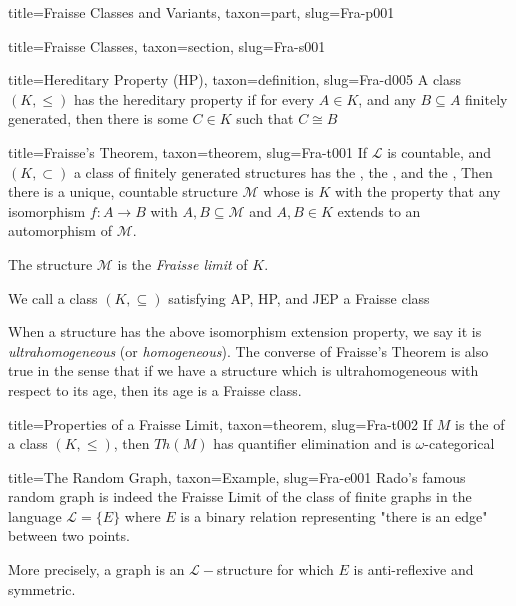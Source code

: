 \documentclass[a4paper]{article}
\begin{document}
\begin{tree}{title={Fraisse Classes and Variants}, taxon={part}, slug={Fra-p001}}
\begin{tree}{title={Fraisse Classes}, taxon={section}, slug={Fra-s001}}
\begin{tree}{title={Hereditary Property (HP)}, taxon={definition}, slug={Fra-d005}}
A class \((K, \leq )\) has the hereditary property if for every \(A \in  K\), and any \(B \subseteq  A\) finitely generated, then there is some \(C \in  K\) such that \(C \cong  B\)
\end{tree}

\begin{tree}{title={Fraisse's Theorem}, taxon={theorem}, slug={Fra-t001}}
If \(\mathcal {L}\) is countable, and \((K, \subset )\) a class of finitely generated structures has the , the , and the , 
Then there is a unique, countable structure \(\mathcal {M}\) whose  is \(K\) with the property that any isomorphism \(f:A \rightarrow  B\) with \(A,B \subseteq   \mathcal {M}\) and \(A,B \in  K\) extends to
an automorphism of \(\mathcal {M}\).\par{The structure \(\mathcal {M}\) is the \emph{Fraisse limit} of \(K\).}\par{We call a class \((K, \subseteq )\) satisfying AP, HP, and JEP a Fraisse class}\par{When a structure has the above isomorphism extension property, we say it is \emph{ultrahomogeneous} (or \emph{homogeneous}). 
The converse of Fraisse's Theorem is also true in the sense that if we have a structure which is ultrahomogeneous with respect to its age, then its age is a Fraisse class.}
\end{tree}

\begin{tree}{title={Properties of a Fraisse Limit}, taxon={theorem}, slug={Fra-t002}}
If \(M\) is the  of a class \((K,  \leq )\), then \(Th(M)\) has quantifier elimination and is \(\omega\)-categorical
\end{tree}

\begin{tree}{title={The Random Graph}, taxon={Example}, slug={Fra-e001}}
Rado's famous random graph is indeed the Fraisse Limit of the class of finite graphs in the language \(\mathcal {L} =  \{ E \}\) where \(E\) is a binary relation representing "there is an edge" between two points.\par{More precisely, a graph is an \(\mathcal {L}-\)structure for which \(E\) is anti-reflexive and symmetric.}
\end{tree}


\end{tree}
\end{tree}
\end{document}
